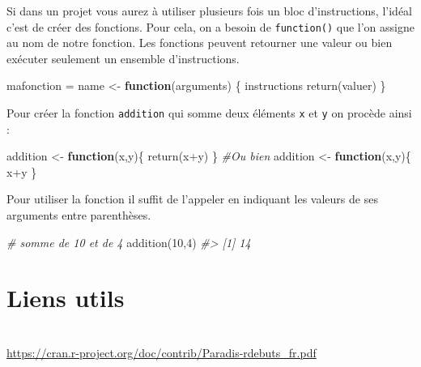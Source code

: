\documentclass[
]{book}
\newenvironment{Shaded}{\begin{snugshade}}{\end{snugshade}}
\newcommand{\CommentTok}[1]{\textcolor[rgb]{0.56,0.35,0.01}{\textit{#1}}}
\newcommand{\ControlFlowTok}[1]{\textcolor[rgb]{0.13,0.29,0.53}{\textbf{#1}}}
\newcommand{\DecValTok}[1]{\textcolor[rgb]{0.00,0.00,0.81}{#1}}
\newcommand{\FunctionTok}[1]{\textcolor[rgb]{0.00,0.00,0.00}{#1}}
\newcommand{\NormalTok}[1]{#1}
\newcommand{\OtherTok}[1]{\textcolor[rgb]{0.56,0.35,0.01}{#1}}
\newcommand{\SpecialCharTok}[1]{\textcolor[rgb]{0.00,0.00,0.00}{#1}}
\theoremstyle{definition}
\theoremstyle{definition}
\theoremstyle{definition}
\theoremstyle{definition}
\theoremstyle{remark}
\begin{document}
Si dans un projet vous aurez à utiliser plusieurs fois un bloc d'instructions, l'idéal c'est de créer des fonctions. Pour cela, on a besoin de \texttt{function()} que l'on assigne au nom de notre fonction.
Les fonctions peuvent retourner une valeur ou bien exécuter seulement un ensemble d'instructions.

\begin{Shaded}
\begin{Highlighting}[]
\NormalTok{mafonction }\OtherTok{=}\NormalTok{ name }\OtherTok{\textless{}{-}} \ControlFlowTok{function}\NormalTok{(arguments) \{}
\NormalTok{  instructions}
  \FunctionTok{return}\NormalTok{(valuer)}
\NormalTok{\}}
\end{Highlighting}
\end{Shaded}

Pour créer la fonction \texttt{addition} qui somme deux éléments \texttt{x} et \texttt{y} on procède ainsi :

\begin{Shaded}
\begin{Highlighting}[]
\NormalTok{addition }\OtherTok{\textless{}{-}} \ControlFlowTok{function}\NormalTok{(x,y)\{}
  \FunctionTok{return}\NormalTok{(x}\SpecialCharTok{+}\NormalTok{y)}
\NormalTok{\}}
\CommentTok{\#Ou bien}
\NormalTok{addition }\OtherTok{\textless{}{-}} \ControlFlowTok{function}\NormalTok{(x,y)\{}
\NormalTok{  x}\SpecialCharTok{+}\NormalTok{y}
\NormalTok{\}}
\end{Highlighting}
\end{Shaded}

Pour utiliser la fonction il suffit de l'appeler en indiquant les valeurs de ses arguments entre parenthèses.

\begin{Shaded}
\begin{Highlighting}[]
\CommentTok{\# somme de 10 et de 4}
\FunctionTok{addition}\NormalTok{(}\DecValTok{10}\NormalTok{,}\DecValTok{4}\NormalTok{)}
\CommentTok{\#\textgreater{} [1] 14}
\end{Highlighting}
\end{Shaded}

\hypertarget{liens-utils}{%
\section*{Liens utils}\label{liens-utils}}

\citet{base}\strut \\
\url{https://cran.r-project.org/doc/contrib/Paradis-rdebuts_fr.pdf}
\end{document}
